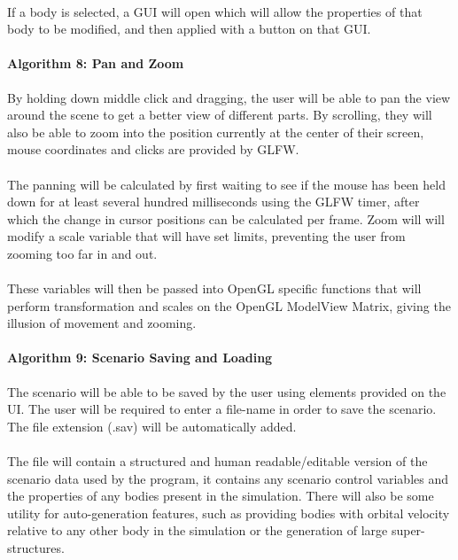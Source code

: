 \paragraph{}
If a body is selected, a GUI will open which will allow the properties of that body to be modified, and then applied with a button on that GUI.

\paragraph{Algorithm 8: Pan and Zoom}
By holding down middle click and dragging, the user will be able to pan the view around the scene to get a better view of different parts. By scrolling, they will also be able to zoom into the position currently at the center of their screen, mouse coordinates and clicks are provided by GLFW.

\paragraph{}
The panning will be calculated by first waiting to see if the mouse has been held down for at least several hundred milliseconds using the GLFW timer, after which the change in cursor positions can be calculated per frame. Zoom will will modify a scale variable that will have set limits, preventing the user from zooming too far in and out.

\paragraph{}
These variables will then be passed into OpenGL specific functions that will perform transformation and scales on the OpenGL ModelView Matrix, giving the illusion of movement and zooming.

\paragraph{Algorithm 9: Scenario Saving and Loading}
The scenario will be able to be saved by the user using elements provided on the UI. The user will be required to enter a file-name in order to save the scenario. The file extension (.sav) will be automatically added.

\paragraph{}
The file will contain a structured and human readable/editable version of the scenario data used by the program, it contains any scenario control variables and the properties of any bodies present in the simulation. There will also be some utility for auto-generation features, such as providing bodies with orbital velocity relative to any other body in the simulation or the generation of large super-structures.

